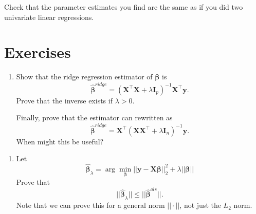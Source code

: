 \documentclass[
]{book}
\providecommand{\tightlist}{%
  \setlength{\itemsep}{0pt}\setlength{\parskip}{0pt}}
\theoremstyle{definition}
\theoremstyle{definition}
\theoremstyle{definition}
\theoremstyle{definition}
\theoremstyle{remark}
\begin{document}
Check that the parameter estimates you find are the same as if you did two univariate linear regressions.

\hypertarget{exercises-7}{%
\section{Exercises}\label{exercises-7}}

\begin{enumerate}
\def\labelenumi{\arabic{enumi}.}
\item
  Show that the ridge regression estimator of \(\boldsymbol \beta\) is
  \[\hat{\boldsymbol \beta}^{ridge} = (\mathbf X^\top \mathbf X+ \lambda\mathbf I_p)^{-1}\mathbf X^\top \mathbf y.\]
  Prove that the inverse exists if \(\lambda > 0\).

  Finally, prove that the estimator can rewritten as
  \[\hat{\boldsymbol \beta}^{ridge} = \mathbf X^\top(\mathbf X\mathbf X^\top + \lambda\mathbf I_n)^{-1} \mathbf y.\]
  When might this be useful?
\end{enumerate}

\begin{enumerate}
\def\labelenumi{\arabic{enumi}.}
\setcounter{enumi}{1}
\tightlist
\item
  Let
  \[\hat{\boldsymbol \beta}_\lambda=\arg \min_{\boldsymbol \beta} ||\mathbf y-\mathbf X\boldsymbol \beta||_2^2+\lambda ||\boldsymbol \beta||\]
  Prove that \[||\hat{\boldsymbol \beta}_\lambda|| \leq ||\hat{\boldsymbol \beta}^{ols}||.\]
  Note that we can prove this for a general norm \(||\cdot||\), not just the \(L_2\) norm.
\end{enumerate}
\end{document}
